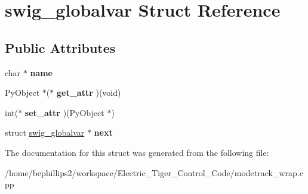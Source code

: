 \hypertarget{structswig__globalvar}{\section{swig\-\_\-globalvar Struct Reference}
\label{structswig__globalvar}
}
\subsection*{Public Attributes}
\begin{DoxyCompactItemize}
\item 
\hypertarget{structswig__globalvar_a32fcb5efb741f97e5c53e1a253cafdd9}{char $\ast$ {\bfseries name}}\label{structswig__globalvar_a32fcb5efb741f97e5c53e1a253cafdd9}

\item 
\hypertarget{structswig__globalvar_a051e346d0cd7608bf99e96726022e88c}{Py\-Object $\ast$($\ast$ {\bfseries get\-\_\-attr} )(void)}\label{structswig__globalvar_a051e346d0cd7608bf99e96726022e88c}

\item 
\hypertarget{structswig__globalvar_a494e3d5a5f1fb694b7738fdd1ffdd657}{int($\ast$ {\bfseries set\-\_\-attr} )(Py\-Object $\ast$)}\label{structswig__globalvar_a494e3d5a5f1fb694b7738fdd1ffdd657}

\item 
\hypertarget{structswig__globalvar_a6b7f8fdec3a5c39a52b33c916d7ba028}{struct \hyperlink{structswig__globalvar}{swig\-\_\-globalvar} $\ast$ {\bfseries next}}\label{structswig__globalvar_a6b7f8fdec3a5c39a52b33c916d7ba028}

\end{DoxyCompactItemize}


The documentation for this struct was generated from the following file\-:\begin{DoxyCompactItemize}
\item 
/home/bephillips2/workspace/\-Electric\-\_\-\-Tiger\-\_\-\-Control\-\_\-\-Code/modetrack\-\_\-wrap.\-cpp\end{DoxyCompactItemize}

